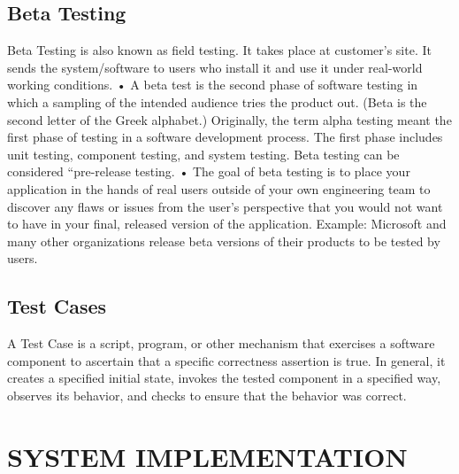 \documentclass[a4paper,12pt]{article}
\begin{document}
\subsection{Beta Testing}  
\hspace{5mm}  
Beta Testing is also known as field testing. It takes place at customer’s site. It sends the system/software to users who install it and use it under real-world working conditions.
•	A beta test is the second phase of software testing in which a sampling of the intended audience tries the product out. (Beta is the second letter of the Greek alphabet.) Originally, the term alpha testing meant the first phase of testing in a software development process. The first phase includes unit testing, component testing, and system testing. Beta testing can be considered “pre-release testing.
•	The goal of beta testing is to place your application in the hands of real users outside of your own engineering team to discover any flaws or issues from the user’s perspective that you would not want to have in your final, released version of the application. Example: Microsoft and many other organizations release beta versions of their products to be tested by users.
\subsection{Test Cases}  
\hspace{5mm}  
A Test Case is a script, program, or other mechanism that exercises a software component to ascertain that a specific correctness assertion is true. In general, it creates a specified initial state, invokes the tested component in a specified way, observes its behavior, and checks to ensure that the behavior was correct.
\newpage
\section{SYSTEM IMPLEMENTATION}  
\hspace{5mm}  
\end{document}
